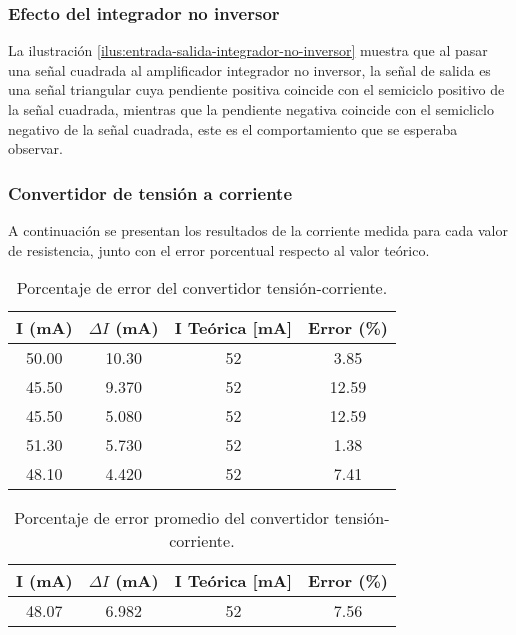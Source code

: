 \subsubsection{Efecto del integrador no inversor}

La ilustración \ref{ilus:entrada-salida-integrador-no-inversor} muestra que al pasar una señal cuadrada al amplificador integrador no inversor, la señal de salida es una señal triangular cuya pendiente positiva coincide con el semiciclo positivo de la señal cuadrada, mientras que la pendiente negativa coincide con el semicliclo negativo de la señal cuadrada, este es el comportamiento que se esperaba observar.

\subsubsection{Convertidor de tensión a corriente}

A continuación se presentan los resultados de la corriente medida para cada valor de resistencia, junto con el error porcentual respecto al valor teórico.

\begin{table}[h!]
\centering
\begin{tabular}{|c|c|c|c|}
\hline
I (mA) & \(\Delta I\) (mA) & I Teórica [mA] & Error (\%) \\ \hline
50.00 & 10.30 & 52 & 3.85 \\ \hline
45.50 & 9.370 & 52 & 12.59 \\ \hline
45.50 & 5.080 & 52 & 12.59 \\ \hline
51.30 & 5.730 & 52 & 1.38 \\ \hline
48.10 & 4.420 & 52 & 7.41 \\ \hline
\end{tabular}
\caption{Porcentaje de error del convertidor tensión-corriente.}
\label{tab:analisis-resultados-convertidor-tension-corriente}
\end{table}

\begin{table}[h!]
\centering
\begin{tabular}{|c|c|c|c|}
\hline
I (mA) & \(\Delta I\) (mA) & I Teórica [mA] & Error (\%) \\ \hline
48.07 & 6.982 & 52 & 7.56 \\ \hline
\end{tabular}
\caption{Porcentaje de error promedio del convertidor tensión-corriente.}
\label{tab:analisis-resultados-convertidor-tension-corriente-promedio}
\end{table}

